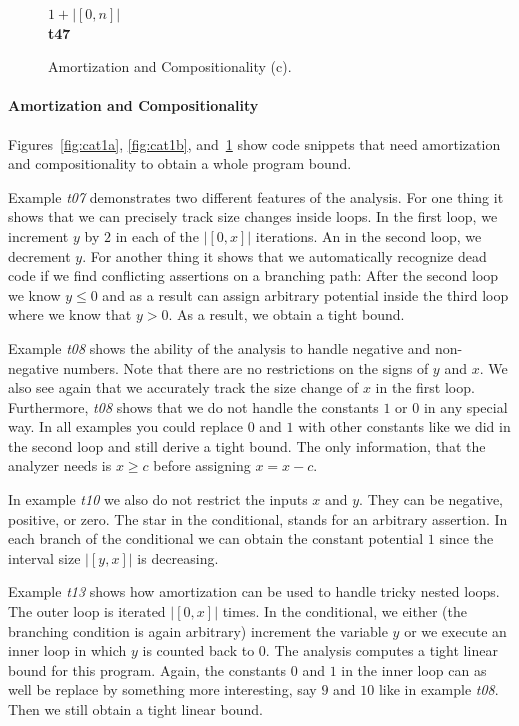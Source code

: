 \documentclass[nocopyrightspace,preprint,pldi]{sigplanconf-pldi15}
\begin{document}
{\begin{figure}[t!]
\begin{minipage}[b]{\progwidth}
\begin{center}
$1 + |[0, n]|$
\\[.7\baselineskip]
      {\bf t47}
    \end{center}
  \end{minipage}

   \caption{Amortization and Compositionality (c).}
  \label{fig:cat1c}
\end{figure}

\paragraph{Amortization and Compositionality}

Figures~\ref{fig:cat1a}, \ref{fig:cat1b}, and~\ref{fig:cat1c} show
code snippets that need amortization and compositionality to obtain a
whole program bound.

Example \emph{t07} demonstrates two different features of the
analysis.  For one thing it shows that we can precisely track size
changes inside loops.  In the first loop, we increment $y$ by $2$ in
each of the $|[0,x]|$ iterations.  An in the second loop, we decrement
$y$.  For another thing it shows that we automatically recognize dead
code if we find conflicting assertions on a branching path: After the
second loop we know $y \leq 0$ and as a result can assign arbitrary
potential inside the third loop where we know that $y>0$.  As a
result, we obtain a tight bound.

Example \emph{t08} shows the ability of the analysis to handle
negative and non-negative numbers.  Note that there are no
restrictions on the signs of $y$ and $x$.  We also see again that we
accurately track the size change of $x$ in the first loop.
Furthermore, \emph{t08} shows that we do not handle the constants $1$
or $0$ in any special way.  In all examples you could replace $0$ and
$1$ with other constants like we did in the second loop and still
derive a tight bound.  The only information, that the analyzer needs
is $x \geq c$ before assigning $x = x - c$.

In example \emph{t10} we also do not restrict the inputs $x$ and $y$.
They can be negative, positive, or zero.  The star {\tt *} in the
conditional, stands for an arbitrary assertion.  In each branch of the
conditional we can obtain the constant potential $1$ since the interval
size $|[y,x]|$ is decreasing.

Example \emph{t13} shows how amortization can be used to handle tricky
nested loops.  The outer loop is iterated $|[0,x]|$ times.  In the
conditional, we either (the branching condition is again arbitrary)
increment the variable $y$ or we execute an inner loop in which $y$ is
counted back to $0$.  The analysis computes a tight linear bound for
this program.  Again, the constants $0$ and $1$ in the inner loop can
as well be replace by something more interesting, say $9$ and $10$
like in example \emph{t08}.  Then we still obtain a tight linear
bound.

}
\end{document}
